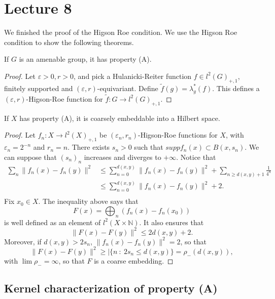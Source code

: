 \section{Lecture 8}

We finished the proof of the Higson Roe condition. We use the Higson Roe condition to show the following theorems.

\begin{thm}
If $G$ is an amenable group, it has property (A).
\end{thm}

\begin{proof}
Let $\varepsilon >0, r>0$, and pick a Hulanicki-Reiter function $f\in l^2(G)_{+,1}$, finitely supported and $(\varepsilon, r)$-equivariant. Define $\tilde f (g) = \lambda_{g}^*(f)$. This defines a $(\varepsilon, r)$-Higson-Roe function for $\tilde f : G \rightarrow l^2(G)_{+,1}$.
\end{proof}

\begin{thm}
If $X$ has property (A), it is coarsely embeddable into a Hilbert space.
\end{thm}

\begin{proof}
Let $f_n : X \rightarrow l^2(X)_{+,1}$ be $(\varepsilon_n,r_n)$-Higson-Roe functions for $X$, with $\varepsilon_n = 2^{-n}$ and $r_n = n$. There exists $s_n>0$ such that $supp f_n(x)\subset B(x,s_n)$. We can suppose that $(s_n)_n$ increases and diverges to $+\infty$. Notice that
\[\begin{split}
\sum_n \|f_n(x) - f_n(y)\|^2 & \leq \sum_{n=0}^{d(x,y)} \|f_n(x) - f_n(y)\|^2 +\sum_{n\geq d(x,y)+1} \frac{1}{4^n} \\
				& \leq \sum_{n=0}^{d(x,y)} \|f_n(x) - f_n(y)\|^2 + 2.\\
\end{split}\]
Fix $x_0\in X$. The inequality above says that  
\[F(x) = \bigoplus_n (f_n(x) - f_n(x_0))\]
is well defined as an element of $l^2(X \times \mathbb N)$. It also ensures that
\[ \|F(x)-F(y)\|^2 \leq 2 d(x,y) +2.\]
Moreover, if $d(x,y)> 2s_n$, $\|f_n(x) - f_n(y)\|^2 = 2$, so that 
\[\|F(x)-F(y)\|^2 \geq | \{ n \ : \ 2s_n \leq  d(x,y)\} = \rho_-(d(x,y)),\]
with $\lim \rho_- =\infty$, so that $F$ is a coarse embedding. 
\end{proof}

\subsection{Kernel characterization of property (A)}

